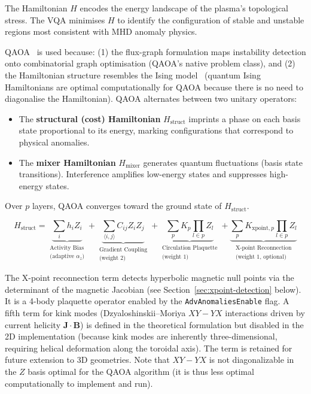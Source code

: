\documentclass[12pt, a4paper, oneside]{report}
\begin{document}
The Hamiltonian $H$ encodes the energy landscape of the plasma's topological stress. The VQA minimises $H$ to identify the configuration of stable and unstable regions most consistent with MHD anomaly physics.

QAOA~\cite{farhi2014} is used because: (1) the flux-graph formulation maps instability detection onto combinatorial graph optimisation (QAOA's native problem class), and (2) the Hamiltonian structure resembles the Ising model~\cite{lucas2014} (quantum Ising Hamiltonians are optimal computationally for QAOA because there is no need to diagonalise the Hamiltonian). QAOA alternates between two unitary operators:
\begin{itemize}
    \item The \textbf{structural (cost) Hamiltonian} $H_{\text{struct}}$ imprints a phase on each basis state proportional to its energy, marking configurations that correspond to physical anomalies.
    \item The \textbf{mixer Hamiltonian} $H_{\text{mixer}}$ generates quantum fluctuations (basis state transitions). Interference amplifies low-energy states and suppresses high-energy states.
\end{itemize}
Over $p$ layers, QAOA converges toward the ground state of $H_{\text{struct}}$.


\begin{equation}
    H_{\text{struct}} =
    \underbrace{\sum_i h_i Z_i}_{\substack{\text{Activity Bias} \\ \text{(adaptive } \alpha_z \text{)}}} +
    \underbrace{\sum_{\langle i,j \rangle} C_{ij} Z_i Z_j}_{\substack{\text{Gradient Coupling} \\ \text{(weight 2)}}} +
    \underbrace{\sum_{p} K_p \prod_{l \in p} Z_l}_{\substack{\text{Circulation Plaquette} \\ \text{(weight 1)}}} +
    \underbrace{\sum_{p} K_{\text{xpoint},p} \prod_{l \in p} Z_l}_{\substack{\text{X-point Reconnection} \\ \text{(weight 1, optional)}}}
\end{equation}

\noindent The X-point reconnection term detects hyperbolic magnetic null points via the determinant of the magnetic Jacobian (see Section~\ref{sec:xpoint-detection} below). It is a 4-body plaquette operator enabled by the \texttt{AdvAnomaliesEnable} flag. A fifth term for kink modes (Dzyaloshinskii--Moriya $XY - YX$ interactions driven by current helicity $\mathbf{J} \cdot \mathbf{B}$) is defined in the theoretical formulation but disabled in the 2D implementation (because kink modes are inherently three-dimensional, requiring helical deformation along the toroidal axis). The term is retained for future extension to 3D geometries. Note that $XY - YX$ is not diagonalizable in the $Z$ basis optimal for the QAOA algorithm (it is thus less optimal computationally to implement and run).
\end{document}
